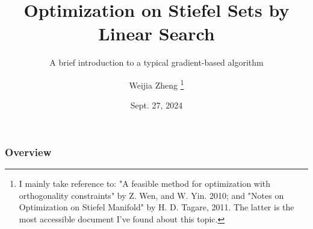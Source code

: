 \documentclass[aspectratio=43, 10pt]{beamer}
\begin{document}
\title{Optimization on Stiefel Sets by Linear Search}
\subtitle{A brief introduction to a typical gradient-based algorithm}
\author{Weijia Zheng 
\thanks{I mainly take reference to: "A feasible method for optimization with orthogonality constraints" by Z. Wen, and W. Yin. 2010; and "Notes on Optimization on Stiefel Manifold" by H. D. Tagare, 2011. The latter is the most accessible document I've found about this topic.}
}

\date{Sept. 27, 2024}

\setcounter{framenumber}{-1}
\frame{\titlepage}




\begin{frame}
\frametitle{Overview} %
\tableofcontents %
\end{frame}



  
\end{document}
